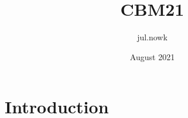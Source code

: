 \documentclass{article}
\title{CBM21}
\author{jul.nowk }
\date{August 2021}
\begin{document}
\maketitle

\section{Introduction}
\end{document}
